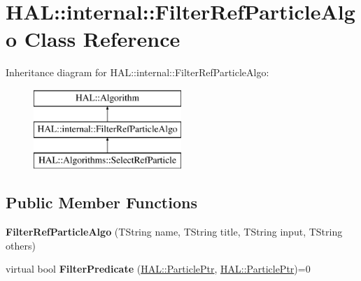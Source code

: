 \hypertarget{class_h_a_l_1_1internal_1_1_filter_ref_particle_algo}{\section{H\-A\-L\-:\-:internal\-:\-:Filter\-Ref\-Particle\-Algo Class Reference}
\label{class_h_a_l_1_1internal_1_1_filter_ref_particle_algo}
}
Inheritance diagram for H\-A\-L\-:\-:internal\-:\-:Filter\-Ref\-Particle\-Algo\-:\begin{figure}[H]
\begin{center}
\leavevmode
\includegraphics[height=3.000000cm]{class_h_a_l_1_1internal_1_1_filter_ref_particle_algo}
\end{center}
\end{figure}
\subsection*{Public Member Functions}
\begin{DoxyCompactItemize}
\item 
\hypertarget{class_h_a_l_1_1internal_1_1_filter_ref_particle_algo_a6583689b4fd466f542791af1b249764a}{{\bfseries Filter\-Ref\-Particle\-Algo} (T\-String name, T\-String title, T\-String input, T\-String others)}\label{class_h_a_l_1_1internal_1_1_filter_ref_particle_algo_a6583689b4fd466f542791af1b249764a}

\item 
\hypertarget{class_h_a_l_1_1internal_1_1_filter_ref_particle_algo_aea4bf3c25a9a65540c3a837ba01b5fd2}{virtual bool {\bfseries Filter\-Predicate} (\hyperlink{class_h_a_l_1_1_generic_particle}{H\-A\-L\-::\-Particle\-Ptr}, \hyperlink{class_h_a_l_1_1_generic_particle}{H\-A\-L\-::\-Particle\-Ptr})=0}\label{class_h_a_l_1_1internal_1_1_filter_ref_particle_algo_aea4bf3c25a9a65540c3a837ba01b5fd2}

\end{DoxyCompactItemize}
